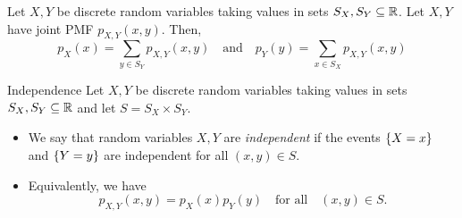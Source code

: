 \documentclass[class=article, crop=false]{standalone}
\begin{document}
  \begin{theorem}{}
    Let $X, Y$ be discrete random variables taking values in sets $S_X, S_Y\subseteq\mathbb{R}$. Let $X, Y$ have joint PMF $p_{X, Y}(x, y)$. Then,
    \[
      p_X(x) = \sum_{y\in S_Y} p_{X, Y}(x, y)\quad\text{and}\quad p_Y(y) = \sum_{x\in S_X} p_{X, Y}(x, y)
    \]
  \end{theorem}
  \begin{definition}{Independence}
    Let $X, Y$ be discrete random variables taking values in sets $S_X, S_Y\subseteq\mathbb{R}$ and let $S = S_X\times S_Y$.
    \begin{itemize}
      \item We say that random variables $X, Y$ are \emph{independent} if the events $\left\{X = x\right\}$ and $\left\{Y = y\right\}$ are independent for all $(x, y)\in S$.
      \item Equivalently, we have
      \[
        p_{X, Y}(x, y) = p_X(x)p_Y(y)\quad\text{for all}\quad(x, y)\in S.
      \]
    \end{itemize}
  \end{definition}
\end{document}
